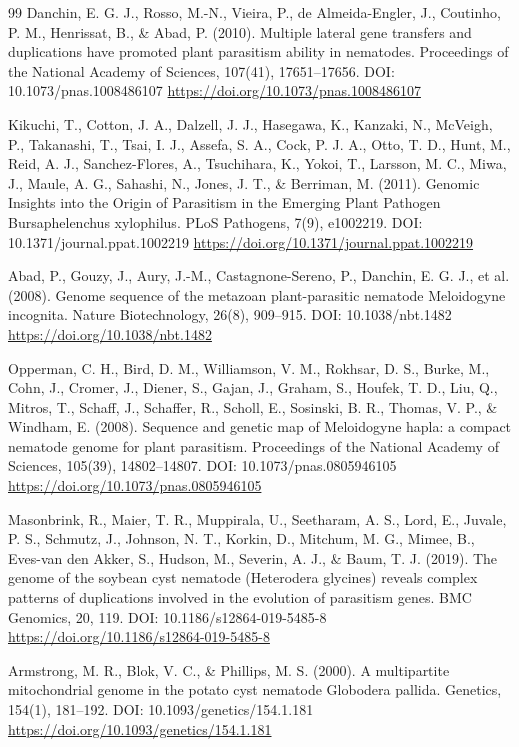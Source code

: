 \documentclass[10pt,letterpaper]{article}
\begin{document}
\begin{thebibliography}{99}
 Danchin, E. G. J., Rosso, M.-N., Vieira, P., de Almeida-Engler, J., Coutinho, P. M., Henrissat, B., \& Abad, P. (2010). Multiple lateral gene transfers and duplications have promoted plant parasitism ability in nematodes. Proceedings of the National Academy of Sciences, 107(41), 17651--17656. DOI: 10.1073/pnas.1008486107 \url{https://doi.org/10.1073/pnas.1008486107}

 Kikuchi, T., Cotton, J. A., Dalzell, J. J., Hasegawa, K., Kanzaki, N., McVeigh, P., Takanashi, T., Tsai, I. J., Assefa, S. A., Cock, P. J. A., Otto, T. D., Hunt, M., Reid, A. J., Sanchez-Flores, A., Tsuchihara, K., Yokoi, T., Larsson, M. C., Miwa, J., Maule, A. G., Sahashi, N., Jones, J. T., \& Berriman, M. (2011). Genomic Insights into the Origin of Parasitism in the Emerging Plant Pathogen Bursaphelenchus xylophilus. PLoS Pathogens, 7(9), e1002219. DOI: 10.1371/journal.ppat.1002219 \url{https://doi.org/10.1371/journal.ppat.1002219}

 Abad, P., Gouzy, J., Aury, J.-M., Castagnone-Sereno, P., Danchin, E. G. J., et al. (2008). Genome sequence of the metazoan plant-parasitic nematode Meloidogyne incognita. Nature Biotechnology, 26(8), 909--915. DOI: 10.1038/nbt.1482 \url{https://doi.org/10.1038/nbt.1482}

 Opperman, C. H., Bird, D. M., Williamson, V. M., Rokhsar, D. S., Burke, M., Cohn, J., Cromer, J., Diener, S., Gajan, J., Graham, S., Houfek, T. D., Liu, Q., Mitros, T., Schaff, J., Schaffer, R., Scholl, E., Sosinski, B. R., Thomas, V. P., \& Windham, E. (2008). Sequence and genetic map of Meloidogyne hapla: a compact nematode genome for plant parasitism. Proceedings of the National Academy of Sciences, 105(39), 14802--14807. DOI: 10.1073/pnas.0805946105 \url{https://doi.org/10.1073/pnas.0805946105}

 Masonbrink, R., Maier, T. R., Muppirala, U., Seetharam, A. S., Lord, E., Juvale, P. S., Schmutz, J., Johnson, N. T., Korkin, D., Mitchum, M. G., Mimee, B., Eves-van den Akker, S., Hudson, M., Severin, A. J., \& Baum, T. J. (2019). The genome of the soybean cyst nematode (Heterodera glycines) reveals complex patterns of duplications involved in the evolution of parasitism genes. BMC Genomics, 20, 119. DOI: 10.1186/s12864-019-5485-8 \url{https://doi.org/10.1186/s12864-019-5485-8}

 Armstrong, M. R., Blok, V. C., \& Phillips, M. S. (2000). A multipartite mitochondrial genome in the potato cyst nematode Globodera pallida. Genetics, 154(1), 181--192. DOI: 10.1093/genetics/154.1.181 \url{https://doi.org/10.1093/genetics/154.1.181}


\end{thebibliography}
\end{document}
